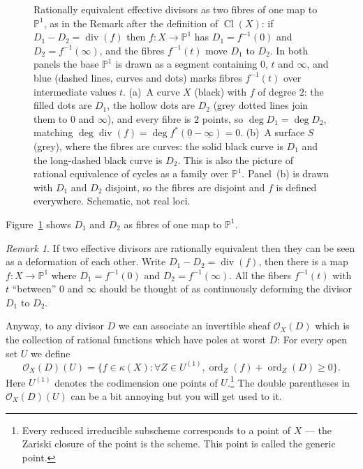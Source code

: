 \documentclass[12pt]{article}
\numberwithin{equation}{section}
\theoremstyle{definition}
\theoremstyle{remark}
\newtheorem{remark}[theorem]{Remark}
\newcommand{\Ocal}{\mathcal{O}}
\newcommand{\PP}{\mathbb{P}}
\newcommand{\ord}{\operatorname{ord}}
\renewcommand{\div}{\operatorname{div}}
\newcommand{\Cl}{\operatorname{Cl}}
\begin{document}
\begin{figure}[H]
\centering

\caption{Rationally equivalent effective divisors as two fibres of one map to $\PP^1$, as in the Remark after the definition of $\Cl(X)$: if $D_1-D_2=\div(f)$ then $f\colon X\to\PP^1$ has $D_1=f^{-1}(0)$ and $D_2=f^{-1}(\infty)$, and the fibres $f^{-1}(t)$ move $D_1$ to $D_2$. In both panels the base $\PP^1$ is drawn as a segment containing $0$, $t$ and $\infty$, and blue (dashed lines, curves and dots) marks fibres $f^{-1}(t)$ over intermediate values $t$. (a)~A curve $X$ (black) with $f$ of degree $2$: the filled dots are $D_1$, the hollow dots are $D_2$ (grey dotted lines join them to $0$ and $\infty$), and every fibre is $2$ points, so $\deg D_1=\deg D_2$, matching $\deg\div(f)=\deg f^*(\underline{0}-\underline{\infty})=0$. (b)~A surface $S$ (grey), where the fibres are curves: the solid black curve is $D_1$ and the long-dashed black curve is $D_2$. This is also the picture of rational equivalence of cycles as a family over $\PP^1$. Panel~(b) is drawn with $D_1$ and $D_2$ disjoint, so the fibres are disjoint and $f$ is defined everywhere. Schematic, not real loci.}\label{fig:rational-equivalence-fibres}
\end{figure}
Figure~\ref{fig:rational-equivalence-fibres} shows $D_1$ and $D_2$ as fibres of one map to $\PP^1$.

\begin{remark}
	If two effective divisors are rationally equivalent then they can be seen as a deformation of each other. 
	Write $D_1 - D_2 = \div(f)$, then there is a map $f:X \to \PP^1$ where $D_1 = f^{-1}(0)$ and $D_2 = f^{-1}(\infty)$. 
	All the fibers $f^{-1}(t)$ with $t$ ``between'' $0$ and $\infty$ should be thought of as continuously deforming the divisor $D_1$ to $D_2$.
\end{remark}

Anyway, to any divisor $D$ we can associate an invertible sheaf $\Ocal_X(D)$ which is the collection of rational functions which have poles at worst $D$:
For every open set $U$ we define 
$$ \Ocal_X(D)(U) = \lbrace f \in \kappa(X) \colon \forall Z \in U^{(1)}, \ord_Z(f)+\ord_Z(D) \geq 0 \rbrace. $$
Here $U^{(1)}$ denotes the codimension one points of $U$.\footnote{Every reduced irreducible subscheme corresponds to a point of $X$ --- the Zariski closure of the point is the scheme. This point is called the generic point.}
The double parentheses in $\Ocal_X(D)(U)$ can be a bit annoying but you will get used to it.
\end{document}
